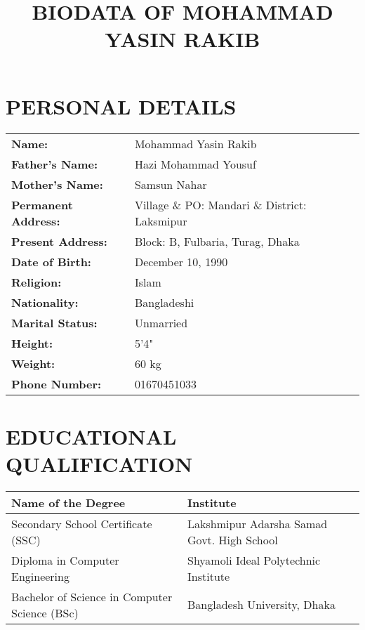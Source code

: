 \documentclass{article}
\begin{document}
\title{BIODATA OF MOHAMMAD YASIN RAKIB}
\date{}
\maketitle

\section*{PERSONAL DETAILS}
\begin{tabular}{@{}l@{\hspace{1cm}}p{8cm}@{}}
    \textbf{Name:} & Mohammad Yasin Rakib \\
    \textbf{Father's Name:} & Hazi Mohammad Yousuf \\
    \textbf{Mother's Name:} & Samsun Nahar \\
    \textbf{Permanent Address:} & Village \& PO: Mandari \& District: Laksmipur \\
    \textbf{Present Address:} & Block: B, Fulbaria, Turag, Dhaka \\
    \textbf{Date of Birth:} & December 10, 1990 \\
    \textbf{Religion:} & Islam \\
    \textbf{Nationality:} & Bangladeshi \\
    \textbf{Marital Status:} & Unmarried \\
    \textbf{Height:} & 5'4" \\
    \textbf{Weight:} & 60 kg \\
    \textbf{Phone Number:} & 01670451033 \\
\end{tabular}

\vspace{1cm} %

\section*{EDUCATIONAL QUALIFICATION}
\begin{tabular}{|>{\centering\arraybackslash}m{7.5cm}|>{\centering\arraybackslash}m{7cm}|}
    \hline
    \textbf{Name of the Degree} & \textbf{Institute}  \\
    \hline
    Secondary School Certificate (SSC) & Lakshmipur Adarsha Samad Govt. High School \\
    \hline
    Diploma in Computer Engineering & Shyamoli Ideal Polytechnic Institute \\
    \hline
    Bachelor of Science in Computer Science (BSc) & Bangladesh University, Dhaka \\
    \hline
\end{tabular}
\end{document}
